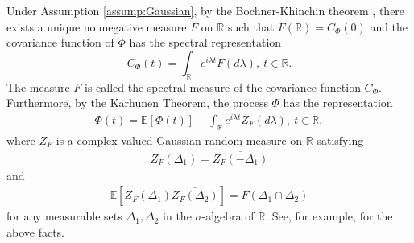 \documentclass{amsart}
\begin{document}
Under Assumption \ref{assump:Gaussian}, by the Bochner-Khinchin theorem \cite[Chapter 4]{krylov2002introduction},
there exists a unique nonnegative measure $F$ on $\mathbb{R}$ such that $F(\mathbb{R}) = C_{\Phi}(0)$
and the covariance function of $\Phi$ has the spectral representation
\begin{equation*}%
C_{\Phi}(t) = \int_{\mathbb{R}}e^{i\lambda t}F(d\lambda),\ t\in \mathbb{R}.
\end{equation*}
The measure $F$ is called the spectral measure of the covariance function $C_{\Phi}$.
Furthermore, by the Karhunen Theorem, the process $\Phi$ has the representation
\begin{align}\label{spectral_rep:samplepath}
\Phi(t)=\mathbb{E}[\Phi(t)]+\int_{\mathbb{R}}
e^{i\lambda t}Z_{F}(d\lambda),\ t\in \mathbb{R},
\end{align}
where $Z_{F}$ is a complex-valued Gaussian random measure on $\mathbb{R}$
satisfying
\begin{align*}
Z_{F}(\Delta_{1})=\overline{Z_{F}(-\Delta_{1})}
\end{align*}
and
\begin{align}\label{ortho}
\mathbb{E}\left[Z_{F}(\Delta_{1})
\overline{Z_{F}(\Delta_{2})}\right]=F(\Delta_{1}\cap\Delta_{2})
\end{align}
for any measurable sets
 $\Delta_{1},\Delta_{2}$ in the $\sigma$-algebra of $\mathbb{R}$.
See, for example, \cite{major1981lecture} for the above facts.
\end{document}
